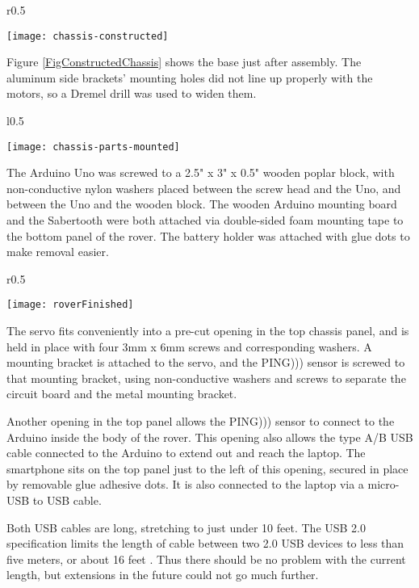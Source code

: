 \begin{wrapfigure}{r}{0.5\textwidth}
	\caption{Constructed Chassis}
	\centering
	\texttt{[image: chassis-constructed]}
	\label{FigConstructedChassis}
\end{wrapfigure}

Figure \ref{FigConstructedChassis} shows the base just after assembly. The aluminum side brackets' mounting holes did not line up properly with the motors, so a Dremel drill was used to widen them.

\begin{wrapfigure}{l}{0.5\textwidth}
	\caption{Pieces Mounted}
	\centering
	\texttt{[image: chassis-parts-mounted]}
	\label{FigChassisParts}
\end{wrapfigure}

The Arduino Uno was screwed to a 2.5" x 3" x 0.5" wooden poplar block, with non-conductive nylon washers placed between the screw head and the Uno, and between the Uno and the wooden block. The wooden Arduino mounting board and the Sabertooth were both attached via double-sided foam mounting tape to the bottom panel of the rover. The battery holder was attached with glue dots to make removal easier.

\begin{wrapfigure}{r}{0.5\textwidth}
	\caption{Construction Finished}
	\centering
	\texttt{[image: roverFinished]}
	\label{FigRoverFinished}
\end{wrapfigure}

The servo fits conveniently into a pre-cut opening in the top chassis panel, and is held in place with four 3mm x 6mm screws and corresponding washers. A mounting bracket is attached to the servo, and the PING))) sensor is screwed to that mounting bracket, using non-conductive washers and screws to separate the circuit board and the metal mounting bracket.

Another opening in the top panel allows the PING))) sensor to connect to the Arduino inside the body of the rover. This opening also allows the type A/B USB cable connected to the Arduino to extend out and reach the laptop. The smartphone sits on the top panel just to the left of this opening, secured in place by removable glue adhesive dots. It is also connected to the laptop via a micro-USB to USB cable.

Both USB cables are long, stretching to just under 10 feet. The USB 2.0 specification limits the length of cable between two 2.0 USB devices to less than five meters, or about 16 feet \cite{usbForum}. Thus there should be no problem with the current length, but extensions in the future could not go much further. 

